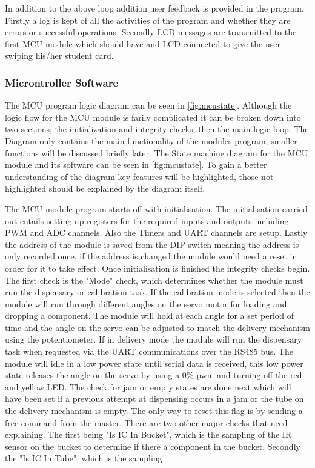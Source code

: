 \documentclass[a4paper,11pt]{article}
\numberwithin{figure}{section}
\numberwithin{table}{section}
\begin{document}
In addition to the above loop addition user feedback is provided in the program. Firstly a log is kept of all the activities of the program and whether they are errors or successful operations. Secondly LCD messages are transmitted to the first MCU module which should have and LCD connected to give the user swiping his/her student card.

\subsubsection{Microntroller Software}

The MCU program  logic diagram can be seen in \autoref{fig:mcustate}. Although the logic flow for the MCU module is farily complicated it can be broken down into two sections; the initialization and integrity checks, then the main logic loop. The Diagram only contains the main functionality of the modules program, smaller functions will be discussed briefly later. The State machine diagram for the MCU module and its software can be seen in \autoref{fig:mcustate}. To gain a better understanding of the diagram key features will be highlighted, those not highlighted should be explained by the diagram itself. 

The MCU module program starts off with initialisation. The initialisation carried out entails setting up registers for the required inputs and outputs including PWM and ADC channels. Also the Timers and UART channels are setup. Lastly the address of the module is saved from the DIP switch meaning the address is only recorded once, if the address is changed the module would need a reset in order for it to take effect. Once initialisation is finished the integrity checks begin. The first check is the "Mode" check, which determines whether the module must run the dispensary or calibration task. If the calibration mode is selected then the module will run through different angles on the servo motor for loading and dropping a component. The module will hold at each angle for a set period of time and the angle on the servo can be adjusted to match the delivery mechanism using the potentiometer. If in delivery mode the module will run the dispensary task when requested via the UART communications over the RS485 bus. The module will idle in a low power state until serial data is received, this low power state releases the angle on the servo by using a 0\% pwm and turning off the red and yellow LED. The check for jam or empty states are done next which will have been set if a previous attempt at dispensing occurs in a jam or the tube on the delivery mechanism is empty. The only way to reset this flag is by sending a free command from the master. There are two other major checks that need explaining. The first being "Is IC In Bucket", which is the sampling of the IR sensor on the bucket to determine if there a component in the bucket. Secondly the "Is IC In Tube", which is the sampling
\end{document}
